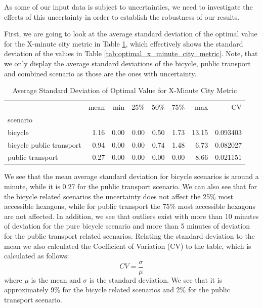As some of our input data is subject to uncertainties, we need to investigate the effects of this uncertainty in order to establish the robustness of our results.

First, we are going to look at the average standard deviation of the optimal value for the X-minute city metric in Table \ref{tab:average_standard_deviation_of_optimal_value_for_x_minute_city_metric}, which effectively shows the standard deviation of the values in Table \ref{tab:optimal_x_minute_city_metric}.
Note, that we only display the average standard deviations of the bicycle, public transport and combined scenario as those are the ones with uncertainty.

\begin{table}
  \caption{Average Standard Deviation of Optimal Value for X-Minute City Metric}
  \label{tab:average_standard_deviation_of_optimal_value_for_x_minute_city_metric}
  \begin{center}
    \begin{tabular}{lrrrrrrr}
     & mean & min & 25\% & 50\% & 75\% & max & CV \\
    scenario &  &  &  &  &  &  &  \\
    bicycle & 1.16 & 0.00 & 0.00 & 0.50 & 1.73 & 13.15 & 0.093403 \\
    bicycle public transport & 0.94 & 0.00 & 0.00 & 0.74 & 1.48 & 6.73 & 0.082027 \\
    public transport & 0.27 & 0.00 & 0.00 & 0.00 & 0.00 & 8.66 & 0.021151 \\
    \end{tabular}
  \end{center}
\end{table}


We see that the mean average standard deviation for bicycle scenarios is around a minute, while it is 0.27 for the public transport scenario.
We can also see that for the bicycle related scenarios the uncertainty does not affect the 25\% most accessible hexagons, while for public transport the 75\% most accessible hexagons are not affected.
In addition, we see that outliers exist with more than 10 minutes of deviation for the pure bicycle scenario and more than 5 minutes of deviation for the public transport related scenarios.
Relating the standard deviation to the mean we also calculated the Coefficient of Variation (CV) to the table, which is calculated as follows:
$$ CV = \frac{\sigma}{\mu} $$
where $\mu$ is the mean and $\sigma$ is the standard deviation.
We see that it is approximately 9\% for the bicycle related scenarios and 2\% for the public transport scenario.


